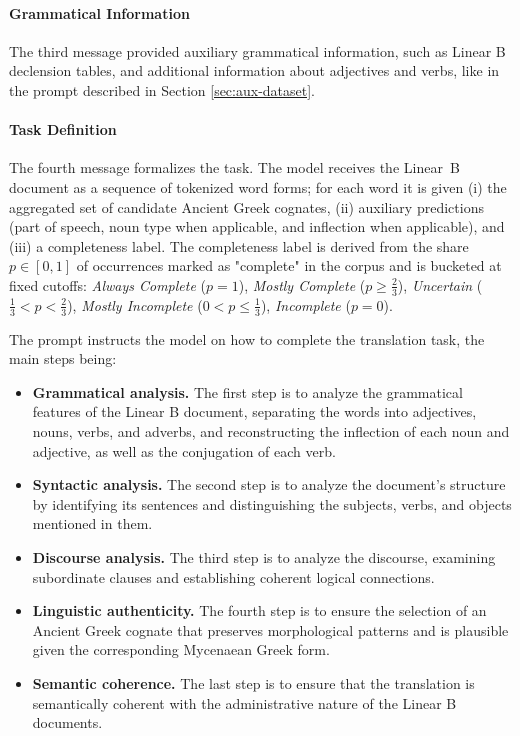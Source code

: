 \paragraph{Grammatical Information}
The third message provided auxiliary grammatical information, such as Linear B declension tables, and additional information about adjectives and verbs, like in the prompt described in Section \ref{sec:aux-dataset}.

\paragraph{Task Definition}
The fourth message formalizes the task. The model receives the Linear~B document as a sequence of tokenized word forms; for each word it is given (i) the aggregated set of candidate Ancient Greek cognates, (ii) auxiliary predictions (part of speech, noun type when applicable, and inflection when applicable), and (iii) a completeness label.
The completeness label is derived from the share $p\!\in\![0,1]$ of occurrences marked as "complete" in the corpus and is bucketed at fixed cutoffs:
\emph{Always Complete} ($p=1$), \emph{Mostly Complete} ($p \geq \frac{2}{3}$), \emph{Uncertain} ($\frac{1}{3} < p < \frac{2}{3}$), \emph{Mostly Incomplete} ($0< p \leq \frac{1}{3}$), \emph{Incomplete} ($p=0$).

The prompt instructs the model on how to complete the translation task, the main steps being:
\begin{itemize}
  \item \textbf{Grammatical analysis.} The first step is to analyze the grammatical features of the Linear B document, separating the words into adjectives, nouns, verbs, and adverbs, and reconstructing the inflection of each noun and adjective, as well as the conjugation of each verb.
  \item \textbf{Syntactic analysis.} The second step is to analyze the document's structure by identifying its sentences and distinguishing the subjects, verbs, and objects mentioned in them.
  \item \textbf{Discourse analysis.} The third step is to analyze the discourse, examining subordinate clauses and establishing coherent logical connections.
  \item \textbf{Linguistic authenticity.} The fourth step is to ensure the selection of an Ancient Greek cognate that preserves morphological patterns and is plausible given the corresponding Mycenaean Greek form.
  \item \textbf{Semantic coherence.} The last step is to ensure that the translation is semantically coherent with the administrative nature of the Linear B documents.
\end{itemize}

